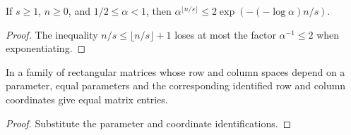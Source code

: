 \begin{theorem}
    \label{thm:window_geometric_exponential}
    \leanok
    If $s\ge1$, $n\ge0$, and $1/2\le\alpha<1$, then
    $\alpha^{\lfloor n/s\rfloor}\le2\exp(-(-\log\alpha)n/s)$.
\end{theorem}
\begin{proof}\leanok
    The inequality $n/s\le\lfloor n/s\rfloor+1$ loses at most
    the factor $\alpha^{-1}\le2$ when exponentiating.
\end{proof}

\begin{theorem}
    \label{thm:dependent_matrix_entries}
    \leanok
    In a family of rectangular matrices whose row and column spaces depend on a
    parameter, equal parameters and the corresponding identified row and column
    coordinates give equal matrix entries.
\end{theorem}
\begin{proof}\leanok
    Substitute the parameter and coordinate identifications.
\end{proof}
